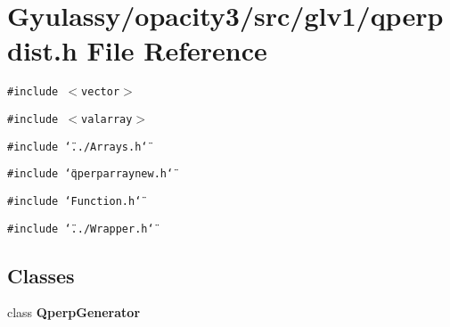 \section{Gyulassy/opacity3/src/glv1/qperpdist.h File Reference}
\label{qperpdist_8h}
{\tt \#include $<$vector$>$}\par
{\tt \#include $<$valarray$>$}\par
{\tt \#include \char`\"{}../Arrays.h\char`\"{}}\par
{\tt \#include \char`\"{}qperparraynew.h\char`\"{}}\par
{\tt \#include \char`\"{}Function.h\char`\"{}}\par
{\tt \#include \char`\"{}../Wrapper.h\char`\"{}}\par
\subsection*{Classes}
\begin{CompactItemize}
\item 
class {\bf QperpGenerator}
\end{CompactItemize}
